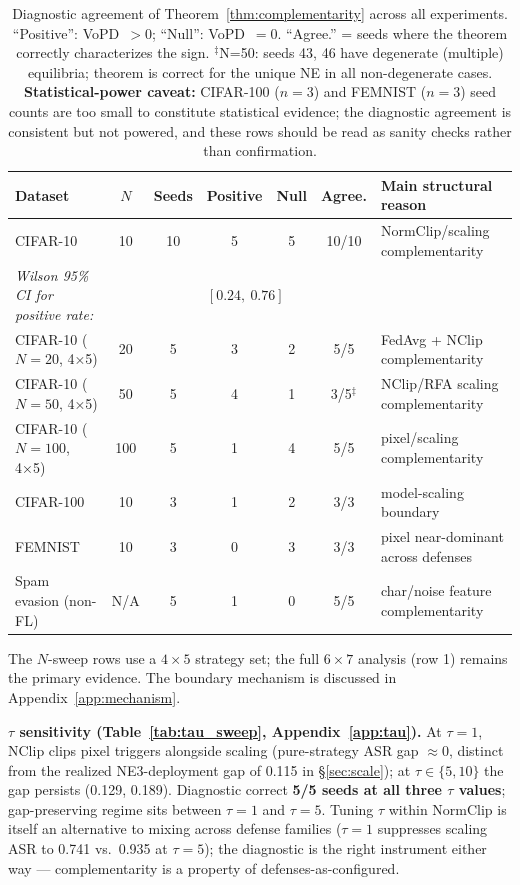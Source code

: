 \documentclass{article}
\begin{document}
\begin{table}[t]
\caption{Diagnostic agreement of Theorem~\ref{thm:complementarity} across all experiments. ``Positive'': VoPD~$> 0$; ``Null'': VoPD~$= 0$. ``Agree.'' = seeds where the theorem correctly characterizes the sign. $^\ddagger$N=50: seeds 43, 46 have degenerate (multiple) equilibria; theorem is correct for the unique NE in all non-degenerate cases. \textbf{Statistical-power caveat:} CIFAR-100 ($n=3$) and FEMNIST ($n=3$) seed counts are too small to constitute statistical evidence; the diagnostic agreement is consistent but not powered, and these rows should be read as sanity checks rather than confirmation.}
\label{tab:diagnostic}
\centering
\small
\begin{tabular}{lcccccl}
\toprule
Dataset & $N$ & Seeds & Positive & Null & Agree. & Main structural reason \\
\midrule
CIFAR-10 & 10 & 10 & 5 & 5 & 10/10 & NormClip/scaling complementarity \\
\quad \emph{Wilson 95\% CI for positive rate:} & & & \multicolumn{4}{l}{$[0.24,\ 0.76]$} \\
CIFAR-10 ($N=20$, 4×5) & 20 & 5 & 3 & 2 & 5/5 & FedAvg + NClip complementarity \\
CIFAR-10 ($N=50$, 4×5) & 50 & 5 & 4 & 1 & 3/5$^\ddagger$ & NClip/RFA scaling complementarity \\
CIFAR-10 ($N=100$, 4×5) & 100 & 5 & 1 & 4 & 5/5 & pixel/scaling complementarity \\
CIFAR-100 & 10 & 3 & 1 & 2 & 3/3 & model-scaling boundary \\
FEMNIST & 10 & 3 & 0 & 3 & 3/3 & pixel near-dominant across defenses \\
\midrule
Spam evasion (non-FL) & N/A & 5 & 1 & 0 & 5/5 & char/noise feature complementarity \\
\bottomrule
\end{tabular}
\end{table}

The $N$-sweep rows use a $4{\times}5$ strategy set; the full $6{\times}7$ analysis (row 1) remains the primary evidence. The boundary mechanism is discussed in Appendix~\ref{app:mechanism}.

\textbf{$\tau$ sensitivity (Table~\ref{tab:tau_sweep}, Appendix~\ref{app:tau}).} At $\tau=1$, NClip clips pixel triggers alongside scaling (pure-strategy ASR gap ${\approx}0$, distinct from the realized NE3-deployment gap of 0.115 in §\ref{sec:scale}); at $\tau\in\{5,10\}$ the gap persists (0.129, 0.189). Diagnostic correct \textbf{5/5 seeds at all three $\tau$ values}; gap-preserving regime sits between $\tau=1$ and $\tau=5$. Tuning $\tau$ within NormClip is itself an alternative to mixing across defense families ($\tau=1$ suppresses scaling ASR to 0.741 vs.\ 0.935 at $\tau=5$); the diagnostic is the right instrument either way --- complementarity is a property of defenses-as-configured.
\end{document}
